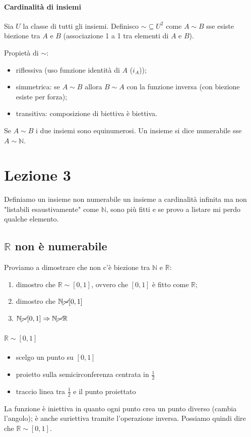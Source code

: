 \documentclass{article}
\begin{document}
\paragraph{Cardinalità di insiemi}
Sia $U$ la classe di tutti gli insiemi. Definisco $ \sim  \subseteq U^2$ come $A \sim B$ sse esiste biezione tra $A$ e $B$ (associazione 1 a 1 tra elementi di $A$ e $B$).


\noindent
Propietà di $ \sim $:
\begin{itemize}
    \item riflessiva (uso funzione identità di $A$ ($i_A$));
    \item simmetrica: se $A \sim B$ allora $B \sim A$ con la funzione inversa (con biezione esiste per forza);    \item transitiva: composizione di biettiva è biettiva.
\end{itemize}

Se $A \sim B$ i due insiemi sono equinumerosi. Un insieme si dice numerabile sse $A \sim \mathbb{N}$. 

\section{Lezione 3}
Definiamo un insieme non numerabile un insieme a cardinalità infinita ma non "listabili esaustivamente" come $\mathbb{N}$, sono più fitti e se provo a listare mi perdo qualche elemento.
\subsection{$\mathbb{R}$ non è numerabile}
Proviamo a dimostrare che non c'è biezione tra $\mathbb{N}$ e $\mathbb{R}$:
\begin{enumerate}
	\item dimostro che $\mathbb{R} \sim [0,1]$, ovvero che $[0,1]$ è fitto come $\mathbb{R}$;
	\item dimostro che $\mathbb{N} \cancel{\sim} [0,1]$
	\item $\mathbb{N} \cancel{\sim} [0,1] \Rightarrow \mathbb{N} \cancel{\sim} \mathbb{R}$
\end{enumerate}
\paragraph{$\mathbb{R} \sim [0,1]$}
\begin{itemize}
	\item scelgo un punto su $[0,1]$
	\item proietto sulla semicirconferenza centrata in $\frac{1}{2}$
	\item traccio linea tra $\frac{1}{2}$ e il punto proiettato
\end{itemize}
La funzione è iniettiva in quanto ogni punto crea un punto diverso (cambia l'angolo); è anche suriettiva tramite l'operazione inversa. Possiamo quindi dire che $\mathbb{R} \sim [0,1]$.
\end{document}
